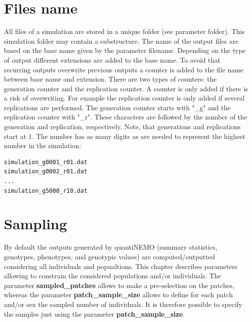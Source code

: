 \documentclass[letterpaper,12pt,oneside]{book}
\begin{document}
\section{Files name}
All files of a simulation are stored in a unique folder (see parameter \textsf{folder}). This simulation folder may contain a substructure. The name of the output files are based on the base name given by the parameter \textsf{filename}. Depending on the type of output different extensions are added to the base name. To avoid that recurring outputs overwrite previous outputs a counter is added to the file name between base name and extension. There are two types of counters: the generation counter and the replication counter. A counter is only added if there is a risk of overwriting. For example the replication counter is only added if several replications are performed. The generation counter starts with "\_g" and the replication counter with "\_r". These characters are followed by the number of the generation and replication, respectively. Note, that generations and replications start at 1. The number has as many digits as are needed to represent the highest number in the simulation: 

\begin{lstlisting}[frame=single]
simulation_g0001_r01.dat
simulation_g0002_r01.dat
...
simulation_g5000_r10.dat
\end{lstlisting}
\section{Sampling}\label{sec:sampling}
By default the outputs generated by quantiNEMO (summary statistics, genotypes, phenotypes, and genotypic values) are computed/outputted considering all individuals and popualtions. This chapter describes parameters allowing to constrain the considered populations and/or individuals. The parameter \textbf{sampled\_patches} allows to make a pre-selection on the patches, whereas the parameter \textbf{patch\_sample\_size} allows to define for each patch and/or sex the sampled number of individuals. It is therefore possible to specify the samples just using the parameter \textbf{patch\_sample\_size}.
 
\end{document}
